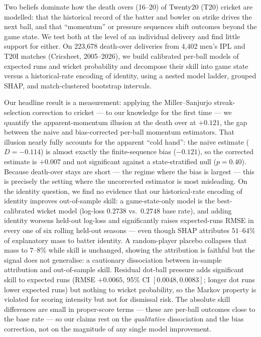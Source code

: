 Two beliefs dominate how the death overs (16--20) of Twenty20 (T20) cricket are
modelled: that the historical record of the batter and bowler on strike drives the
next ball, and that ``momentum'' or pressure sequences shift outcomes beyond the
game state. We test both at the level of an individual delivery and find little
support for either. On 223{,}678 death-over deliveries from 4{,}402 men's IPL and
T20I matches (Cricsheet, 2005--2026), we build calibrated per-ball models of
expected runs and wicket probability and decompose their skill into game state
versus a historical-rate encoding of identity, using a nested model ladder, grouped
SHAP, and match-clustered bootstrap intervals.

Our headline result is a measurement: applying the Miller--Sanjurjo
streak-selection correction to cricket --- to our knowledge for the first time ---
we quantify the apparent-momentum illusion at the death over at $+0.121$, the gap
between the naive and bias-corrected per-ball momentum estimators. That illusion
nearly fully accounts for the apparent ``cold hand'': the naive estimate
($D=-0.114$) is almost exactly the finite-sequence bias ($-0.121$), so the
corrected estimate is $+0.007$ and not significant against a state-stratified null
($p=0.40$). Because death-over stays are short --- the regime where the bias is
largest --- this is precisely the setting where the uncorrected estimator is most
misleading. On the identity question, we find no evidence that our
historical-rate encoding of identity improves out-of-sample skill: a
game-state-only model is the best-calibrated wicket model (log-loss $0.2738$ vs.\
$0.2748$ base rate), and adding identity worsens held-out log-loss and
significantly raises expected-runs RMSE in every one of six rolling held-out
seasons --- even though SHAP attributes $51$--$64\%$ of explanatory mass to batter
identity. A random-player placebo collapses that mass to $7$--$8\%$ while skill is
unchanged, showing the attribution is faithful but the signal does not generalise:
a cautionary dissociation between in-sample attribution and out-of-sample skill.
Residual dot-ball pressure adds significant skill to expected runs (RMSE $+0.0065$,
95\% CI $[0.0048, 0.0083]$; longer dot runs lower expected runs) but nothing to
wicket probability, so the Markov property is violated for scoring intensity but
not for dismissal risk. The absolute skill differences are small in proper-score
terms --- these are per-ball outcomes close to the base rate --- so our claims rest
on the \emph{qualitative} dissociation and the bias correction, not on the
magnitude of any single model improvement.
